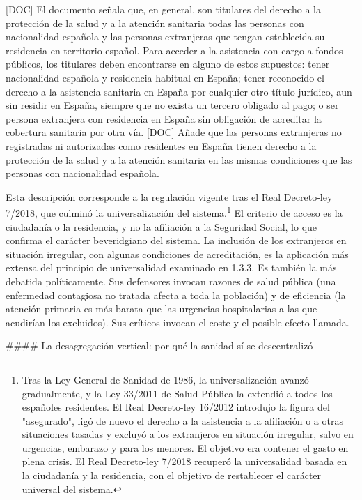 \documentclass[10pt,a4paper]{article}
\begin{document}
[DOC] El documento señala que, en general, son titulares del derecho a la protección de la salud y a la atención sanitaria todas las personas con nacionalidad española y las personas extranjeras que tengan establecida su residencia en territorio español. Para acceder a la asistencia con cargo a fondos públicos, los titulares deben encontrarse en alguno de estos supuestos: tener nacionalidad española y residencia habitual en España; tener reconocido el derecho a la asistencia sanitaria en España por cualquier otro título jurídico, aun sin residir en España, siempre que no exista un tercero obligado al pago; o ser persona extranjera con residencia en España sin obligación de acreditar la cobertura sanitaria por otra vía. [DOC] Añade que las personas extranjeras no registradas ni autorizadas como residentes en España tienen derecho a la protección de la salud y a la atención sanitaria en las mismas condiciones que las personas con nacionalidad española.

Esta descripción corresponde a la regulación vigente tras el Real Decreto-ley 7/2018, que culminó la universalización del sistema.\footnote{Tras la Ley General de Sanidad de 1986, la universalización avanzó gradualmente, y la Ley 33/2011 de Salud Pública la extendió a todos los españoles residentes. El Real Decreto-ley 16/2012 introdujo la figura del "asegurado", ligó de nuevo el derecho a la asistencia a la afiliación o a otras situaciones tasadas y excluyó a los extranjeros en situación irregular, salvo en urgencias, embarazo y para los menores. El objetivo era contener el gasto en plena crisis. El Real Decreto-ley 7/2018 recuperó la universalidad basada en la ciudadanía y la residencia, con el objetivo de restablecer el carácter universal del sistema.
} El criterio de acceso es la ciudadanía o la residencia, y no la afiliación a la Seguridad Social, lo que confirma el carácter beveridgiano del sistema. La inclusión de los extranjeros en situación irregular, con algunas condiciones de acreditación, es la aplicación más extensa del principio de universalidad examinado en 1.3.3. Es también la más debatida políticamente. Sus defensores invocan razones de salud pública (una enfermedad contagiosa no tratada afecta a toda la población) y de eficiencia (la atención primaria es más barata que las urgencias hospitalarias a las que acudirían los excluidos). Sus críticos invocan el coste y el posible efecto llamada.

#### La desagregación vertical: por qué la sanidad sí se descentralizó
\end{document}
